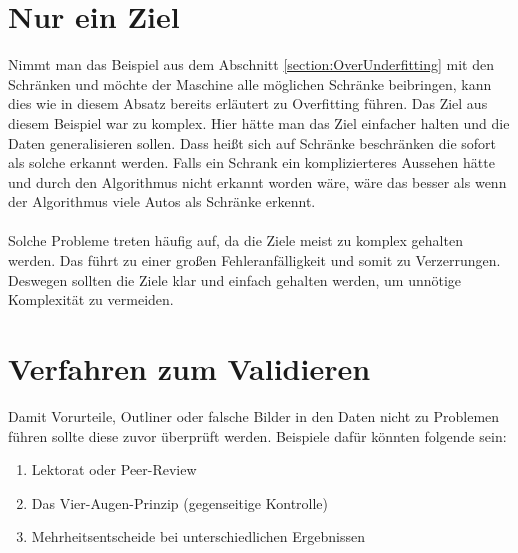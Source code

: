 \documentclass[12pt,oneside,a4paper,parskip]{scrbook}
\begin{document}
\section{Nur ein Ziel}
\label{section:oneGoal}
Nimmt man das Beispiel aus dem Abschnitt \ref{section:OverUnderfitting} mit den Schränken und möchte der Maschine alle möglichen Schränke beibringen, kann dies wie in diesem Absatz bereits erläutert zu Overfitting führen. Das Ziel aus diesem Beispiel war zu komplex. Hier hätte man das Ziel einfacher halten und die Daten generalisieren sollen. Dass heißt sich auf Schränke beschränken die sofort als solche erkannt werden. Falls ein Schrank ein komplizierteres Aussehen hätte und durch den Algorithmus nicht erkannt worden wäre, wäre das besser als wenn der Algorithmus viele Autos als Schränke erkennt.
\\\\
Solche Probleme treten häufig auf, da die Ziele meist zu komplex gehalten werden. Das führt zu einer großen Fehleranfälligkeit und somit zu Verzerrungen. Deswegen sollten die Ziele klar und einfach gehalten werden, um unnötige Komplexität zu vermeiden.

\section{Verfahren zum Validieren}
\label{section:validate}

Damit Vorurteile, Outliner oder falsche Bilder in den Daten nicht zu Problemen führen sollte diese zuvor überprüft werden. Beispiele dafür könnten folgende sein:
\begin{enumerate}
	\item Lektorat oder Peer-Review
	\item Das Vier-Augen-Prinzip (gegenseitige Kontrolle)
	\item Mehrheitsentscheide bei unterschiedlichen Ergebnissen
\end{enumerate}
\end{document}
